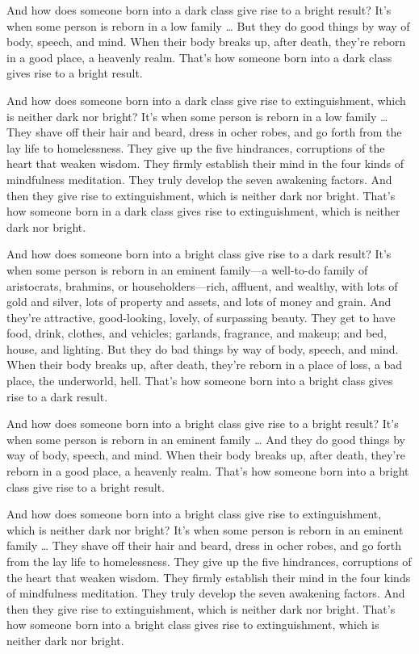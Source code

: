 \documentclass[12pt,openany]{book}%
\begin{document}
And how does someone born into a dark class give rise to a bright result? It’s when some person is reborn in a low family … But they do good things by way of body, speech, and mind. When their body breaks up, after death, they’re reborn in a good place, a heavenly realm. That’s how someone born into a dark class gives rise to a bright result. 

And how does someone born into a dark class give rise to extinguishment, which is neither dark nor bright? It’s when some person is reborn in a low family … They shave off their hair and beard, dress in ocher robes, and go forth from the lay life to homelessness. They give up the five hindrances, corruptions of the heart that weaken wisdom. They firmly establish their mind in the four kinds of mindfulness meditation. They truly develop the seven awakening factors. And then they give rise to extinguishment, which is neither dark nor bright. That’s how someone born in a dark class gives rise to extinguishment, which is neither dark nor bright. 

And how does someone born into a bright class give rise to a dark result? It’s when some person is reborn in an eminent family—a well-to-do family of aristocrats, brahmins, or householders—rich, affluent, and wealthy, with lots of gold and silver, lots of property and assets, and lots of money and grain. And they’re attractive, good-looking, lovely, of surpassing beauty. They get to have food, drink, clothes, and vehicles; garlands, fragrance, and makeup; and bed, house, and lighting. But they do bad things by way of body, speech, and mind. When their body breaks up, after death, they’re reborn in a place of loss, a bad place, the underworld, hell. That’s how someone born into a bright class gives rise to a dark result. 

And how does someone born into a bright class give rise to a bright result? It’s when some person is reborn in an eminent family … And they do good things by way of body, speech, and mind. When their body breaks up, after death, they’re reborn in a good place, a heavenly realm. That’s how someone born into a bright class give rise to a bright result. 

And how does someone born into a bright class give rise to extinguishment, which is neither dark nor bright? It’s when some person is reborn in an eminent family … They shave off their hair and beard, dress in ocher robes, and go forth from the lay life to homelessness. They give up the five hindrances, corruptions of the heart that weaken wisdom. They firmly establish their mind in the four kinds of mindfulness meditation. They truly develop the seven awakening factors. And then they give rise to extinguishment, which is neither dark nor bright. That’s how someone born into a bright class gives rise to extinguishment, which is neither dark nor bright. 
\end{document}
